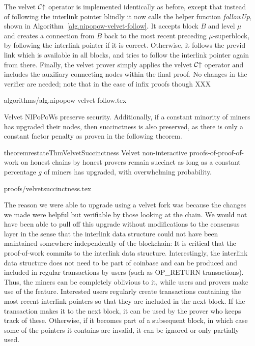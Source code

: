The velvet $\mathcal{C}\negthickspace\uparrow$ operator
is implemented identically as before, except that instead of following the
interlink pointer blindly it now calls the helper function \textit{followUp},
shown in Algorithm~\ref{alg.nipopow-velvet-follow}. It accepts block $B$ and
level $\mu$ and creates a connection from $B$ back to the most recent preceding
$\mu$-superblock, by following the interlink pointer if it is correct.
Otherwise, it follows the previd link which is available in all blocks, and
tries to follow the interlink pointer again from there. Finally, the velvet
prover
simply applies the velvet $\mathcal{C}\negthickspace\uparrow$ operator and includes the auxiliary
connecting nodes within the final proof. No changes in the verifier are needed; note that in the case of infix proofs though XXX

{algorithms/alg.nipopow-velvet-follow.tex}

Velvet NIPoPoWs preserve security. Additionally, if a constant minority of
miners has upgraded their nodes, then succinctness is also preserved, as there
is only a constant factor penalty as proven in the following theorem.

\begin{restatable}{theorem}{restateThmVelvetSuccinctness}
    \label{thm.velvet-succinctness}
    Velvet non-interactive proofs-of-proof-of-work on honest chains by honest
    provers remain succinct as long as a constant percentage $g$ of miners has
    upgraded, with overwhelming probability.
\end{restatable}

\ifonecolumn
{proofs/velvetsuccinctness.tex}
\fi

The reason we were able to upgrade using a velvet fork was because the changes
we made were helpful but verifiable by those looking at the chain. We would not
have been able to pull off this upgrade without modifications to the consensus
layer in the sense that the interlink data structure could not have been
maintained somewhere independently of the blockchain: It is critical that the
proof-of-work commits to the interlink data structure. Interestingly, the
interlink data structure does not need to be part of coinbase and can be
produced and included in regular transactions by users (such as OP\_RETURN
transactions). Thus, the miners can be completely oblivious to it, while users
and provers make use of the feature. Interested users regularly create
transactions containing the most recent interlink pointers so that they are
included in the next block. If the transaction makes it to the next block, it
can be used by the prover who keeps track of these. Otherwise, if it becomes
part of a subsequent block, in which case some of the pointers it contains are
invalid, it can be ignored or only partially used.

